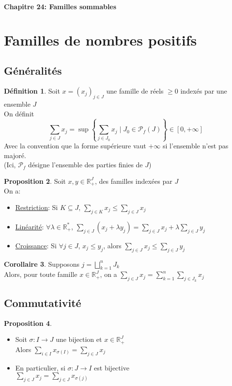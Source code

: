 \documentclass[10pt,a4paper]{article}
\theoremstyle{definition}
\newtheorem{proposition}{Proposition}[section]
\newtheorem{corollaire}[proposition]{Corollaire}
\newtheorem{definition}[proposition]{Définition}
\begin{document}
\renewcommand{\labelitemi}{$*$}
\begin{center}
{\Large \textbf{Chapitre 24: Familles sommables}}
\end{center}
\section{Familles de nombres positifs}
\subsection{Généralités}
\begin{definition}
Soit $x = (x_j)_{j \in J}$ une famille de réels $\geq 0$ indexés par une ensemble $J$ \\
On définit
\[\sum\limits_{j \in J} x_j = \sup \left\{ \sum\limits_{j \in J_0} x_j \mid J_0 \in \mathcal{P}_f(J) \right\} \in [0, +\infty]\]
Avec la convention que la forme supérieure vaut $+\infty$ si l'ensemble n'est pas majoré. \\
(Ici, $\mathcal{P}_f$ désigne l'ensemble des parties finies de $J$)
\end{definition}
\begin{proposition}
Soit $x, y \in \mathbb{R}_+^J$, des familles indexées par $J$ \\
On a:
\begin{itemize}
\item \uline{Restriction}: Si $K \subseteq J$, $\sum\limits_{j \in K} x_j \leq \sum\limits_{j \in J} x_j$
\item \uline{Linéarité}: $\forall \lambda \in \mathbb{R}_+^*$, $\sum\limits_{j \in J} (x_j + \lambda y_j) = \sum\limits_{j \in J} x_j + \lambda \sum_{j \in J} y_j$
\item \uline{Croissance}: Si $\forall j \in J$, $x_j \leq y_j$, alors $\sum\limits_{j \in J} x_j \leq \sum\limits_{j \in J} y_j$
\end{itemize}
\end{proposition}
\begin{corollaire}
Supposons $j = \bigsqcup\limits_{k = 1}^n J_k$ \\
Alors, pour toute famille $x \in \mathbb{R}_+^J$, on a $\sum\limits_{j \in J} x_j = \sum\limits_{k = 1}^n \sum\limits_{j \in J_k} x_j$
\end{corollaire}

\subsection{Commutativité}
\begin{proposition}
\hfill
\begin{itemize}
\item Soit $\sigma: I \to J$ une bijection et $x \in \mathbb{R}_+^J$ \\
Alors $\sum\limits_{i \in I} x_{\sigma(I)} = \sum\limits_{j \in J} x_j$
\item En particulier, si $\sigma: J \to I$ est bijective \\
$\sum\limits_{j \in J} x_j = \sum\limits_{j \in J} x_{\sigma(j)}$
\end{itemize}
\end{proposition}
\end{document}
